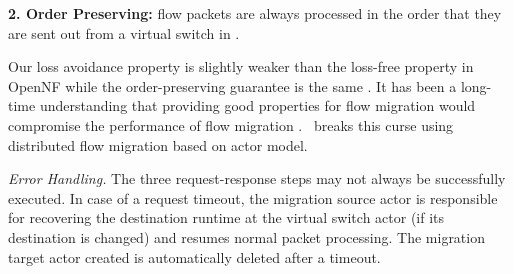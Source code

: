 \textbf{2. Order Preserving:} %
flow packets are always processed in the order that they are sent out from a virtual switch in \nfactor. %

Our loss avoidance property is slightly weaker than the loss-free property in OpenNF while the order-preserving guarantee is the same \cite{gember2015opennf}. It has been a long-time understanding that providing good properties for flow migration would compromise the performance of flow migration \cite{gember2015opennf}. \nfactor~breaks this curse using distributed flow migration based on actor model.


{\em Error Handling.} The three request-response steps may not always be successfully executed. In case of a request timeout, the migration source actor is responsible for recovering the destination runtime at the virtual switch actor (if its destination is changed) and resumes normal packet processing. The migration target actor created is automatically deleted after a timeout.
